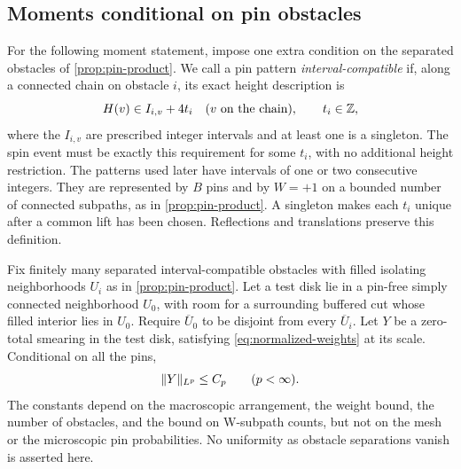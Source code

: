\subsection{Moments conditional on pin obstacles}

For the following moment statement, impose one extra condition on the
separated obstacles of \cref{prop:pin-product}.  We call a pin pattern
\emph{interval-compatible} if, along a connected chain on obstacle $i$,
its exact height description is
\begin{equation}\label{eq:interval-pin-description}
 H(v)\in I_{i,v}+4t_i\quad(v\hbox{ on the chain}),\qquad t_i\in\mathbb Z,
\end{equation}
where the $I_{i,v}$ are prescribed integer intervals and at least one is
a singleton.  The spin event must be exactly this requirement for some
$t_i$, with no additional height restriction.  The patterns used later
have intervals of one or two consecutive integers.  They are represented
by $B$ pins and by $W=+1$ on a bounded number of connected subpaths,
as in \cref{prop:pin-product}.  A singleton makes each $t_i$ unique after
a common lift has been chosen.  Reflections and translations preserve
this definition.

\begin{proposition}\label{prop:obstacle-moments}
Fix finitely many separated interval-compatible obstacles with filled
isolating neighborhoods $U_i$ as in \cref{prop:pin-product}.  Let a test
disk lie in a pin-free simply connected neighborhood $U_0$, with room
for a surrounding buffered cut whose filled interior lies in $U_0$.
Require $\overline U_0$ to be disjoint from every $\overline U_i$.
Let $Y$ be a zero-total smearing in the test disk, satisfying
\eqref{eq:normalized-weights} at its scale.  Conditional on all the pins,
\begin{equation}\label{eq:obstacle-moment-bound}
 \lVert Y\rVert_{L^p}\leq C_p\qquad(p<\infty).
\end{equation}
The constants depend on the macroscopic arrangement, the weight bound,
the number of obstacles, and the bound on W-subpath counts, but not on
the mesh or the microscopic pin probabilities.  No uniformity as obstacle
separations vanish is asserted here.
\end{proposition}

